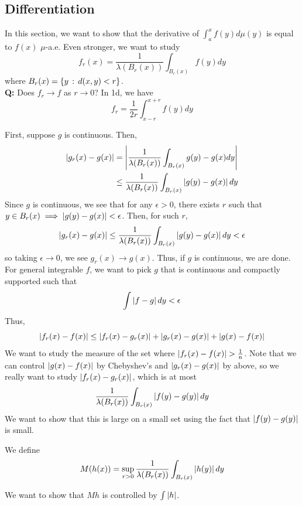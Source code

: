 \subsection*{Differentiation}
\sectionspace

In this section, we want to show that the derivative of $\int_{a}^{x} f(y) d\mu(y)$ is equal to $f(x)$ $\mu$-a.e. Even stronger, we want to study
\[ f_r(x) = \frac{1}{\lambda(B_r(x))} \int_{B_r(x)} f(y) dy \]
where $B_r(x) = \{y \, :\, d(x, y) < r\}$.\\

\textbf{Q:} Does $f_r \to f$ as $r \to 0$? In 1d, we have
\[ f_r = \frac{1}{2r} \int_{x - r}^{x + r} f(y) dy \]

First, suppose $g$ is continuous. Then,
\begin{align*}
    \left\lvert {g_r(x) - g(x)} \right\rvert &= \left\lvert {\frac{1}{\lambda(B_r(x))} \int_{B_r(x)} g(y) - g(x) dy} \right\rvert\\
    &\leq \frac{1}{\lambda(B_r(x))} \int_{B_r(x)} \left\lvert {g(y) - g(x)} \right\rvert dy
\end{align*}
Since $g$ is continuous, we see that for any $\epsilon > 0$, there exists $r$ such that $y \in B_r(x) \implies \left\lvert {g(y) - g(x)} \right\rvert < \epsilon$. Then, for such $r$,
\[ \left\lvert {g_r(x) - g(x)} \right\rvert \leq \frac{1}{\lambda(B_r(x))} \int_{B_r(x)} \left\lvert {g(y) - g(x)} \right\rvert dy < \epsilon \]
so taking $\epsilon \to 0$, we see $g_r(x) \to g(x)$. Thus, if $g$ is continuous, we are done.\\

For general integrable $f$, we want to pick $g$ that is continuous and compactly supported such that
\[ \int \left\lvert {f - g} \right\rvert dy < \epsilon \]
Thus,
\[ \left\lvert {f_r(x) - f(x)} \right\rvert \leq \left\lvert {f_r(x) - g_r(x)} \right\rvert + \left\lvert {g_r(x) - g(x)} \right\rvert + \left\lvert {g(x) - f(x)} \right\rvert \]
We want to study the measure of the set where $\left\lvert {f_r(x) - f(x)} \right\rvert > \frac{1}{n}$. 
Note that we can control $\left\lvert {g(x) - f(x)} \right\rvert$ by Chebyshev's and $\left\lvert {g_r(x) - g(x)} \right\rvert$ by above, so we really want to study $\left\lvert {f_r(x) - g_r(x)} \right\rvert$, which is at most
\[ \frac{1}{\lambda(B_r(x))} \int_{B_r(x)} \left\lvert {f(y) - g(y)} \right\rvert dy \]
We want to show that this is large on a small set using the fact that $\left\lvert {f(y) - g(y)} \right\rvert$ is small.

\begin{definition}
    We define
    \[ M(h(x)) = \sup_{r > 0} \frac{1}{\lambda(B_r(x))} \int_{B_r(x)} \left\lvert {h(y)} \right\rvert dy \]
\end{definition}

We want to show that $Mh$ is controlled by $\int \left\lvert {h} \right\rvert$.
